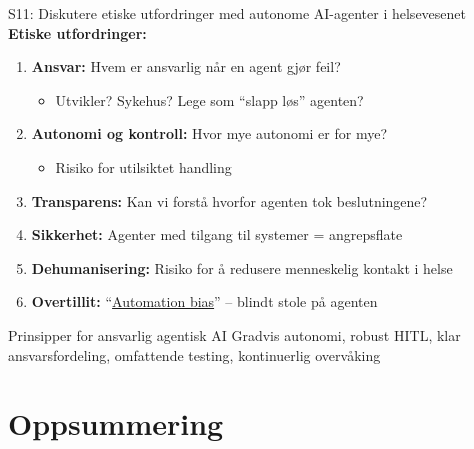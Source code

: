\documentclass[aspectratio=169, 10pt]{beamer}
\begin{document}
\begin{frame}{S11: Diskutere etiske utfordringer med autonome AI-agenter i helsevesenet}
    \textbf{Etiske utfordringer:}
    
    \vspace{0.3cm}
    \begin{enumerate}
        \item \textbf{Ansvar:} Hvem er ansvarlig når en agent gjør feil?
        \begin{itemize}
            \item Utvikler? Sykehus? Lege som ``slapp løs'' agenten?
        \end{itemize}
        
        \item \textbf{Autonomi og kontroll:} Hvor mye autonomi er for mye?
        \begin{itemize}
            \item Risiko for utilsiktet handling
        \end{itemize}
        
        \item \textbf{Transparens:} Kan vi forstå hvorfor agenten tok beslutningene?
        
        \item \textbf{Sikkerhet:} Agenter med tilgang til systemer = angrepsflate
        
        \item \textbf{Dehumanisering:} Risiko for å redusere menneskelig kontakt i helse
        
        \item \textbf{Overtillit:} ``\href{https://en.wikipedia.org/wiki/Automation_bias}{Automation bias}'' -- blindt stole på agenten
    \end{enumerate}
    
    \vspace{0.3cm}
    \begin{block}{Prinsipper for ansvarlig agentisk AI}
        Gradvis autonomi, robust HITL, klar ansvarsfordeling, omfattende testing, kontinuerlig overvåking
    \end{block}
\end{frame}

\section*{Oppsummering}
\end{document}

